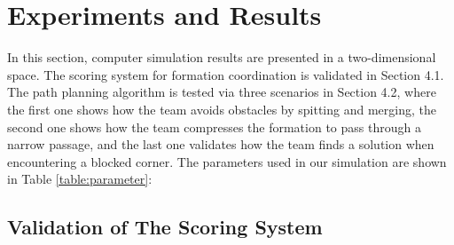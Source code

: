 \chapter{Experiments and Results}
In this section, computer simulation results are presented in a two-dimensional space. The scoring system for formation coordination is validated in Section 4.1. The path planning algorithm is tested via three scenarios in Section 4.2, where the first one shows how the team avoids obstacles by spitting and merging, the second one shows how the team compresses the formation to pass through a narrow passage, and the last one validates how the team finds a solution when encountering a blocked corner. The parameters used in our simulation are shown in Table \ref{table:parameter}:


\begin{center}
\label{table:parameter}
\end{center}


\section{Validation of The Scoring System}

